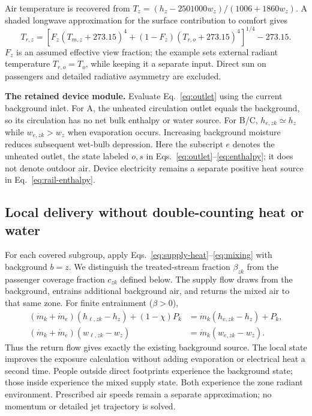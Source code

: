 Air temperature is recovered from $T_z=(h_z-2501000w_z)/(1006+1860w_z)$. A shaded longwave approximation for the surface contribution to comfort \cite{thermalcomfort} gives
\begin{equation}
 T_{r,z}=\left[F_z(T_{m,z}+273.15)^4+(1-F_z)(T_{r,o}+273.15)^4\right]^{1/4}-273.15.
\label{eq:rail-mrt}
\end{equation}
$F_z$ is an assumed effective view fraction; the example sets external radiant temperature $T_{r,o}=T_o$, while keeping it a separate input. Direct sun on passengers and detailed radiative asymmetry are excluded.

\noindent\textbf{The retained device module.} Evaluate Eq.~\eqref{eq:outlet} using the current background inlet. For A, the unheated circulation outlet equals the background, so its circulation has no net bulk enthalpy or water source. For B/C, $h_{e,zk}\simeq h_z$ while $w_{e,zk}>w_z$ when evaporation occurs. Increasing background moisture reduces subsequent wet-bulb depression. Here the subscript $e$ denotes the unheated outlet, the state labeled $o,s$ in Eqs.~\eqref{eq:outlet}--\eqref{eq:enthalpy}; it does not denote outdoor air. Device electricity remains a separate positive heat source in Eq.~\eqref{eq:rail-enthalpy}.

\subsection{Local delivery without double-counting heat or water}

For each covered subgroup, apply Eqs.~\eqref{eq:supply-heat}--\eqref{eq:mixing} with background $b=z$. We distinguish the treated-stream fraction $\beta_{zk}$ from the passenger coverage fraction $c_{zk}$ defined below. The supply flow draws from the background, entrains additional background air, and returns the mixed air to that same zone. For finite entrainment ($\beta>0$),
\begin{align}
 (\dot m_k+\dot m_e)(h_{\ell,zk}-h_z)+(1-\chi)P_k
 &=\dot m_k(h_{e,zk}-h_z)+P_k,\\
 (\dot m_k+\dot m_e)(w_{\ell,zk}-w_z)
 &=\dot m_k(w_{e,zk}-w_z).
\label{eq:return-closure}
\end{align}
Thus the return flow gives exactly the existing background source. The local state improves the exposure calculation without adding evaporation or electrical heat a second time. People outside direct footprints experience the background state; those inside experience the mixed supply state. Both experience the zone radiant environment. Prescribed air speeds remain a separate approximation; no momentum or detailed jet trajectory is solved.

